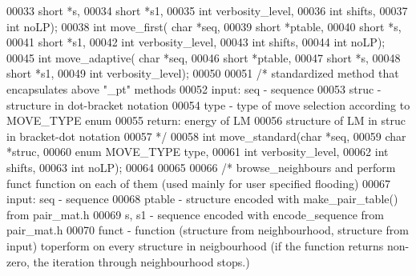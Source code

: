 \begin{DoxyCode}
00033                   \textcolor{keywordtype}{short} *s,
00034                   \textcolor{keywordtype}{short} *s1,
00035                   \textcolor{keywordtype}{int} verbosity\_level,
00036                   \textcolor{keywordtype}{int} shifts,
00037                   \textcolor{keywordtype}{int} noLP);
00038 \textcolor{keywordtype}{int} move\_first( \textcolor{keywordtype}{char} *seq,
00039                 \textcolor{keywordtype}{short} *ptable,
00040                 \textcolor{keywordtype}{short} *s,
00041                 \textcolor{keywordtype}{short} *s1,
00042                 \textcolor{keywordtype}{int} verbosity\_level,
00043                 \textcolor{keywordtype}{int} shifts,
00044                 \textcolor{keywordtype}{int} noLP);
00045 \textcolor{keywordtype}{int} move\_adaptive(  \textcolor{keywordtype}{char} *seq,
00046                 \textcolor{keywordtype}{short} *ptable,
00047                 \textcolor{keywordtype}{short} *s,
00048                 \textcolor{keywordtype}{short} *s1,
00049                 \textcolor{keywordtype}{int} verbosity\_level);
00050 
00051 \textcolor{comment}{/* standardized method that encapsulates above "\_pt" methods}
00052 \textcolor{comment}{  input:  seq - sequence}
00053 \textcolor{comment}{          struc - structure in dot-bracket notation}
00054 \textcolor{comment}{          type - type of move selection according to MOVE\_TYPE enum}
00055 \textcolor{comment}{  return: energy of LM}
00056 \textcolor{comment}{          structure of LM in struc in bracket-dot notation}
00057 \textcolor{comment}{*/}
00058 \textcolor{keywordtype}{int} move\_standard(\textcolor{keywordtype}{char} *seq,
00059                   \textcolor{keywordtype}{char} *struc,
00060                   \textcolor{keyword}{enum} MOVE\_TYPE type,
00061                   \textcolor{keywordtype}{int} verbosity\_level,
00062                   \textcolor{keywordtype}{int} shifts,
00063                   \textcolor{keywordtype}{int} noLP);
00064 
00065 
00066 \textcolor{comment}{/* browse\_neighbours and perform funct function on each of them (used mainly for user specified flooding)}
00067 \textcolor{comment}{    input:    seq - sequence}
00068 \textcolor{comment}{              ptable - structure encoded with make\_pair\_table() from pair\_mat.h}
00069 \textcolor{comment}{              s, s1 - sequence encoded with encode\_sequence from pair\_mat.h}
00070 \textcolor{comment}{              funct - function (structure from neighbourhood, structure from input) toperform on every
       structure in neigbourhood (if the function returns non-zero, the iteration through neighbourhood stops.)}

\end{DoxyCode}
